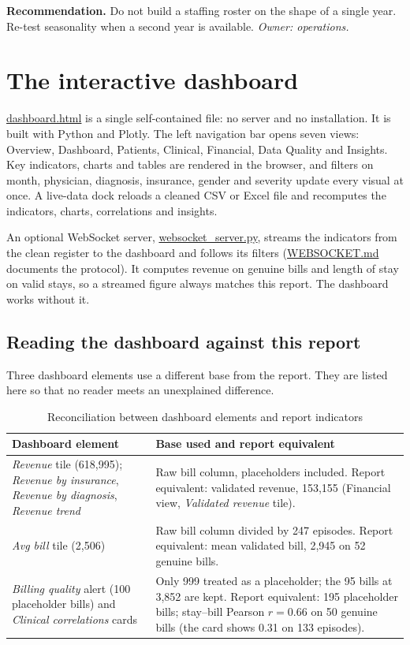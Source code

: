 \documentclass[12pt,a4paper]{article}
\newcommand{\F}[1]{{\small\url{#1}}}
\begin{document}
\textbf{Recommendation.} Do not build a staffing roster on the shape of a single
year. Re-test seasonality when a second year is available. \emph{Owner: operations.}

\section{The interactive dashboard}

\F{dashboard.html} is a single self-contained file: no server and no installation.
It is built with Python and Plotly. The left navigation bar opens seven views:
Overview, Dashboard, Patients, Clinical, Financial, Data Quality and Insights. Key
indicators, charts and tables are rendered in the browser, and filters on month,
physician, diagnosis, insurance, gender and severity update every visual at once.
A live-data dock reloads a cleaned CSV or Excel file and recomputes the indicators,
charts, correlations and insights.

An optional WebSocket server, \F{websocket_server.py}, streams the indicators from the
clean register to the dashboard and follows its filters (\F{WEBSOCKET.md} documents
the protocol). It computes revenue on genuine bills and length of stay on valid stays,
so a streamed figure always matches this report. The dashboard works without it.

\subsection{Reading the dashboard against this report}

Three dashboard elements use a different base from the report. They are listed here
so that no reader meets an unexplained difference.

\begin{table}[H]\centering\singlespacing
\caption{Reconciliation between dashboard elements and report indicators}
\small
\begin{tabularx}{\linewidth}{@{}p{4.6cm}X@{}}
\toprule
\textbf{Dashboard element} & \textbf{Base used and report equivalent} \\ \midrule
\emph{Revenue} tile (618{,}995); \emph{Revenue by insurance}, \emph{Revenue by
diagnosis}, \emph{Revenue trend} & Raw bill column, placeholders included.
Report equivalent: validated revenue, 153{,}155 (Financial view,
\emph{Validated revenue} tile). \\
\emph{Avg bill} tile (2{,}506) & Raw bill column divided by 247 episodes. Report
equivalent: mean validated bill, 2{,}945 on 52 genuine bills. \\
\emph{Billing quality} alert (100 placeholder bills) and \emph{Clinical correlations}
cards & Only 999 treated as a placeholder; the 95 bills at 3{,}852 are kept. Report
equivalent: 195 placeholder bills; stay--bill Pearson $r = 0.66$ on 50 genuine bills
(the card shows 0.31 on 133 episodes). \\
\bottomrule
\end{tabularx}
\end{table}
\end{document}
